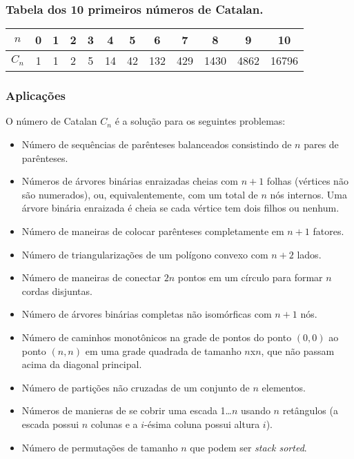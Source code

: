 \subsubsection*{Tabela dos 10 primeiros números de Catalan.}
\begin{center}
    \begin{tabular}{c | c c c c c c c c c c c }
        $n$ & 0 &1& 2& 3& 4& 5& 6& 7& 8& 9& 10 \\
        \hline
        $C_n$ & 1& 1& 2& 5& 14& 42& 132& 429& 1430& 4862& 16796 \\
    \end{tabular}
\end{center}

\subsubsection*{Aplicações}
O número de Catalan $C_n$ é a solução para os seguintes problemas:
\begin{multicols}{2}
    \begin{itemize}
        \item Número de sequências de parênteses balanceados consistindo de $n$ pares de parênteses.
        \item Números de árvores binárias enraizadas cheias com $n+1$ folhas (vértices não são numerados), ou, equivalentemente, com um total de $n$ nós internos. Uma árvore binária enraizada é cheia se cada vértice tem dois filhos ou nenhum.
        \item Número de maneiras de colocar parênteses completamente em $n+1$ fatores.
        \item Número de triangularizações de um polígono convexo com $n+2$ lados.
        \item Número de maneiras de conectar $2n$ pontos em um círculo para formar $n$ cordas disjuntas.
        \item Número de árvores binárias completas não isomórficas com $n+1$ nós.
        \item Número de caminhos monotônicos na grade de pontos do ponto $(0,0)$ ao ponto $(n,n)$ em uma grade quadrada de tamanho $n$x$n$, que não passam acima da diagonal principal.
        \item Número de partições não cruzadas de um conjunto de $n$ elementos.
        \item Números de manieras de se cobrir uma escada 1\dots $n$ usando $n$ retângulos (a escada possui $n$ colunas e a $i$-ésima coluna possui altura $i$).
        \item Número de permutações de tamanho $n$ que podem ser \textit{stack sorted}.
    \end{itemize}
\end{multicols}

